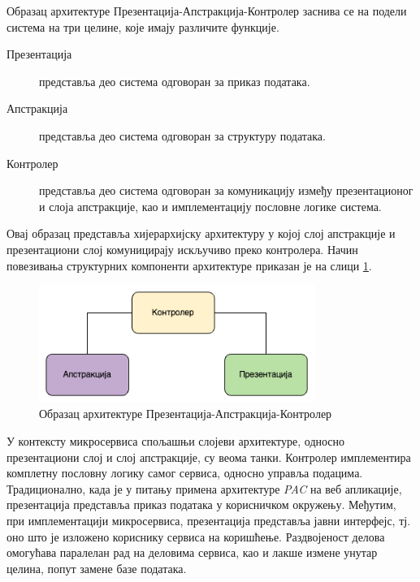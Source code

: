 \documentclass[12pt,oneside]{memoir}
\begin{document}
Образац архитектуре Презентација-Апстракција-Контролер заснива се на подели система на три целине, које имају различите функције.
\begin{description}
\item[Презентација]представља део система одговоран за приказ података.
\item[Апстракција]представља део система одговоран за структуру података.
\item[Контролер]представља део система одговоран за комуникацију између презентационог и слоја апстракције, као и имплементацију пословне логике система.
\end{description}

Овај образац представља хијерархијску архитектуру у којој слој апстракције и презентациони слој комуницирају искључиво преко контролера. Начин повезивања структурних компоненти архитектуре приказан је на слици \ref{fig:pac}.

\begin{figure}[!ht]
  \centering
  \includegraphics[width=0.8\textwidth]{matfmaster/img/PAC.png}
  \caption{Образац архитектуре Презентација-Апстракција-Контролер}
  \label{fig:pac}
\end{figure}

У контексту микросервиса спољашњи слојеви архитектуре, односно презентациони слој и слој апстракције, су веома танки. Контролер имплементира комплетну пословну логику самог сервиса, односно управља подацима. Традиционално, када је у питању примена архитектуре \textit{PAC} на веб апликације, презентација представља приказ података у корисничком окружењу. Међутим, при имплементацији микросервиса, презентација представља јавни интерфејс, тј. оно што је изложено кориснику сервиса на коришћење. Раздвојеност делова омогућава паралелан рад на деловима сервиса, као и лакше измене унутар целина, попут замене базе података. 



\end{document}
